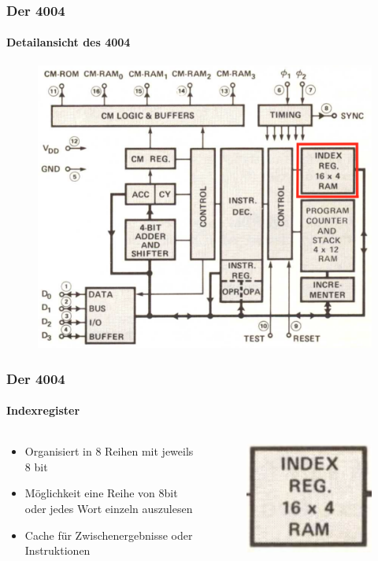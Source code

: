 \begin{frame}
	\frametitle{Der 4004}
	\framesubtitle{Detailansicht des 4004}
	\begin{figure}[ht]
		\includegraphics[width=0.7\linewidth]{images/layout_4004_2.png}
	\end{figure}
\end{frame}

\begin{frame}
	\frametitle{Der 4004}
	\framesubtitle{Indexregister}
	\begin{columns}
		\begin{column}{.5\textwidth}
			\begin{itemize}
				\item Organisiert in 8 Reihen mit jeweils 8 bit
				\item Möglichkeit eine Reihe von 8bit oder jedes Wort einzeln auszulesen
				\item Cache für Zwischenergebnisse oder Instruktionen
			\end{itemize}
		\end{column}
		\begin{column}{.5\textwidth}
			\begin{figure}[ht]
				\includegraphics[width=0.6\linewidth]{images/index_register.png}
			\end{figure}
		\end{column}
	\end{columns}
\end{frame}

